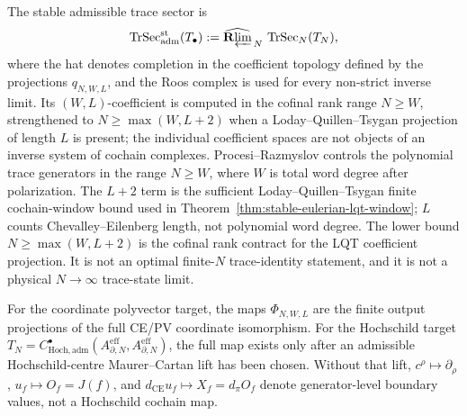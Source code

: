 \begin{defn}
  The stable admissible trace sector is
  \[
    \operatorname{TrSec}^{\mathrm{st}}_{\mathrm{adm}}(T_\bullet)
    :=
    \widehat{\mathbf R\!\varprojlim}_{\,N}\,
    \operatorname{TrSec}_N(T_N),
  \]
  where the hat denotes completion in the coefficient topology defined
  by the projections \(q_{N,W,L}\), and the Roos complex is used for
  every non-strict inverse limit.  Its \((W,L)\)-coefficient is computed
  in the cofinal rank range \(N\geq W\), strengthened to
  \(N\geq\max(W,L+2)\) when a Loday--Quillen--Tsygan projection of
  length \(L\) is present; the individual coefficient spaces are not
  objects of an inverse system of cochain complexes.
  Procesi--Razmyslov controls the polynomial trace generators in the
  range \(N\geq W\), where \(W\) is total word degree after
  polarization.  The \(L+2\) term is the sufficient
  Loday--Quillen--Tsygan finite cochain-window bound used in
  Theorem~\ref{thm:stable-eulerian-lqt-window}; \(L\) counts
  Chevalley--Eilenberg length, not polynomial word degree.  The lower
  bound \(N\geq\max(W,L+2)\) is the cofinal rank contract for the LQT
  coefficient projection.  It is not an optimal finite-\(N\)
  trace-identity statement, and it is not a physical \(N\to\infty\)
  trace-state limit.

  For the coordinate polyvector target, the maps \(\Phi_{N,W,L}\) are
  the finite output projections of the full CE/PV coordinate
  isomorphism.
  For the Hochschild target
  \(T_N=C^\bullet_{\mathrm{Hoch},\mathrm{adm}}
  (A^{\mathrm{eff}}_{\partial,N},A^{\mathrm{eff}}_{\partial,N})\),
  the full map exists only after an admissible Hochschild-centre
  Maurer--Cartan lift has been chosen.  Without that lift,
  \(c^\rho\mapsto\partial_\rho\),
  \(u_f\mapsto O_f=J(f)\), and
  \(d_{\mathrm{CE}}u_f\mapsto X_f=d_\pi O_f\) denote generator-level
  boundary values, not a Hochschild cochain map.


\end{defn}
